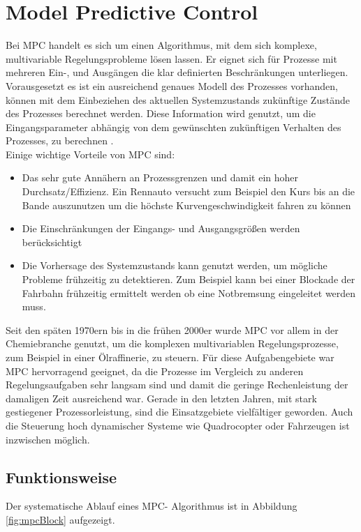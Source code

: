 \documentclass{like}
\begin{document}
\section{Model Predictive Control}
\label{MPC}
Bei \ac{MPC} handelt es sich um einen Algorithmus, mit dem sich komplexe, multivariable Regelungsprobleme lösen lassen. Er eignet sich für Prozesse mit mehreren Ein-, und Ausgängen die klar definierten Beschränkungen unterliegen. Vorausgesetzt es ist ein ausreichend genaues Modell des Prozesses vorhanden, können mit dem Einbeziehen des aktuellen Systemzustands zukünftige Zustände des Prozesses berechnet werden. Diese Information wird genutzt, um die Eingangsparameter abhängig von dem gewünschten zukünftigen Verhalten des Prozesses, zu berechnen \cite{seborg2010process}. \\
Einige wichtige Vorteile von \ac{MPC} sind: 
\begin{itemize}
	\item Das sehr gute Annähern an Prozessgrenzen und damit ein hoher Durchsatz/Effizienz. Ein Rennauto versucht zum Beispiel den Kurs bis an die Bande auszunutzen um die höchste Kurvengeschwindigkeit fahren zu können
	\item Die Einschränkungen der Eingangs- und Ausgangsgrößen werden berücksichtigt
	\item Die Vorhersage des Systemzustands kann genutzt werden, um mögliche Probleme frühzeitig zu detektieren. Zum Beispiel kann bei einer Blockade der Fahrbahn frühzeitig ermittelt werden ob eine Notbremsung eingeleitet werden muss.
\end{itemize}
Seit den späten 1970ern bis in die frühen 2000er wurde \ac{MPC} vor allem in der Chemiebranche genutzt, um die komplexen multivariablen Regelungsprozesse, zum Beispiel in einer Ölraffinerie, zu steuern. Für diese Aufgabengebiete war \ac{MPC} hervorragend geeignet, da die Prozesse im Vergleich zu anderen Regelungsaufgaben sehr langsam sind und damit die geringe Rechenleistung der damaligen Zeit ausreichend war. 
Gerade in den letzten Jahren, mit stark gestiegener Prozessorleistung, sind die Einsatzgebiete vielfältiger geworden. Auch die Steuerung hoch dynamischer Systeme wie Quadrocopter \cite{quadcopterMpc} oder Fahrzeugen \cite{carMPC} ist inzwischen möglich. 

\subsection*{Funktionsweise}
Der systematische Ablauf eines \ac{MPC}- Algorithmus ist in Abbildung \ref{fig:mpcBlock} aufgezeigt.  
\end{document}
